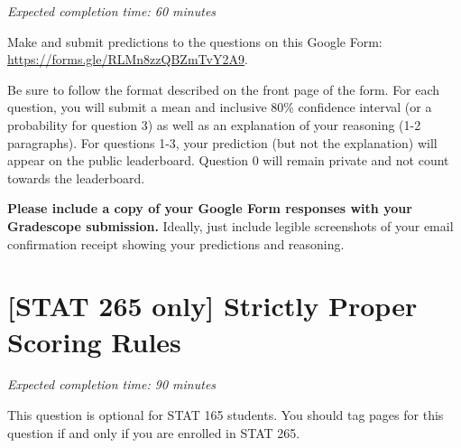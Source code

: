 \documentclass[11pt]{article}
\begin{document}
\emph{Expected completion time: 60 minutes}

Make and submit predictions to the questions on this Google Form: \\ \url{https://forms.gle/RLMn8zzQBZmTvY2A9}.

Be sure to follow the format
described on the front page of the form.
For each question, you will submit a mean and inclusive 80\% confidence interval (or a probability
for question 3) as well as an explanation of your reasoning (1-2 paragraphs).
For questions 1-3, your prediction (but not the explanation) will appear on the public leaderboard.
Question 0 will remain private and not count towards the leaderboard.

\textbf{Please include a copy of your Google Form responses with your Gradescope submission.} Ideally, just include legible screenshots of your email confirmation receipt showing your predictions and reasoning.


\newpage
\section*{[STAT 265 only] Strictly Proper Scoring Rules}
\emph{Expected completion time: 90 minutes}

This question is optional for STAT 165 students. You should tag pages for this question if and only if you are enrolled in STAT 265.
\end{document}
